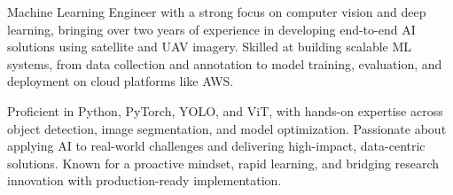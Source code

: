 

\begin{cvparagraph}

Machine Learning Engineer with a strong focus on computer vision and deep learning, bringing over two years of experience in developing end-to-end AI solutions using satellite and UAV imagery. Skilled at building scalable ML systems, from data collection and annotation to model training, evaluation, and deployment on cloud platforms like AWS.

Proficient in Python, PyTorch, YOLO, and ViT, with hands-on expertise across object detection, image segmentation, and model optimization. Passionate about applying AI to real-world challenges and delivering high-impact, data-centric solutions. Known for a proactive mindset, rapid learning, and bridging research innovation with production-ready implementation.
\end{cvparagraph}